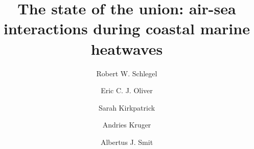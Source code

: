 \documentclass[a4paper,10pt,review]{elsarticle}
\begin{document}
\begin{frontmatter}

\title{The state of the union: air-sea interactions during coastal marine heatwaves}

\author[firstaddress]{Robert W. Schlegel}
\author[secondaddress,thirdaddress]{Eric C. J. Oliver}
\author[fourthaddress]{Sarah Kirkpatrick}
\author[fifthaddress,sixthaddress]{Andries Kruger}
\author[firstaddress]{Albertus J. Smit}


\address[firstaddress]{Department of Biodiversity and Conservation Biology, University of the Western Cape, Private Bag X17, Bellville 7535, South Africa}

\address[secondaddress]{ARC Centre of Excellence for Climate System Science, Australia}

\address[thirdaddress]{Institute for Marine and Antarctic Studies, University of Tasmania, Hobart, Australia}

\address[fourthaddress]{UWA Oceans Institute and School of Plant Biology, The University of Western Australia, Crawley, 6009 Western Australia, Australia}

\address[fifthaddress]{Climate Service, South African Weather Service, Pretoria, South Africa}

\address[sixthaddress]{Department of Geography, Geoinformatics and Meteorology, Faculty of Natural and Agricultural Sciences, University of Pretoria, South Africa}



\end{frontmatter}
\end{document}
